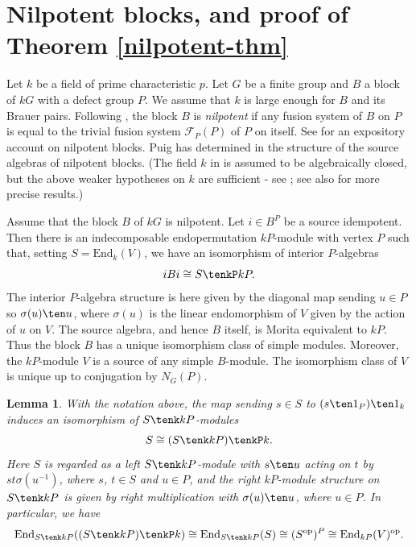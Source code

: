 \documentclass{amsart}
\theoremstyle{plain}\newtheorem{Theorem}{Theorem}[section]
\theoremstyle{plain}\newtheorem{Conjecture}[Theorem]{Conjecture}
\theoremstyle{plain}\newtheorem{Corollary}[Theorem]{Corollary}
\theoremstyle{plain}\newtheorem{Lemma}[Theorem]{Lemma}
\theoremstyle{plain}\newtheorem{Proposition}[Theorem]{Proposition}
\theoremstyle{definition}\newtheorem{Definition}[Theorem]{Definition}
\theoremstyle{definition}\newtheorem{Example}[Theorem]{Example}
\theoremstyle{definition}\newtheorem{Examples}[Theorem]{Examples}
\theoremstyle{definition}\newtheorem{Exercise}[Theorem]{Exercise}
\theoremstyle{definition}\newtheorem{Notation}[Theorem]{Notation}
\theoremstyle{definition}\newtheorem{Remark}[Theorem]{Remark}
\theoremstyle{definition}\newtheorem{Remarks}[Theorem]{Remarks}
\theoremstyle{plain}\newtheorem{Statement}[Theorem]{}
\def\CF{{\mathcal{F}}}  \def\OS{{\mathcal{O}S}}
\def\End{\mathrm{End}}
\def\op{\mathrm{op}}
\begin{document}
\section{Nilpotent blocks, and proof of Theorem \ref{nilpotent-thm} }
\label{nilpotent-Section}   %

Let $k$ be  a field of prime characteristic $p$. Let $G$ be a finite group and $B$ a 
block of $kG$ with a defect group $P$.
We assume that $k$ is large enough for $B$ and its Brauer pairs.
Following \cite{BrPunil}, the block $B$ is {\em nilpotent} if any fusion system
of $B$ on $P$ is equal to the trivial fusion system $\CF_P(P)$ of $P$ on itself.
See \cite[Section 8.11]{LiBookII} for an expository account on nilpotent blocks.
Puig has determined in \cite{Punil} the structure of the source algebras of
nilpotent blocks. (The field $k$ in \cite{Punil} is assumed to be algebraically closed,
but the above weaker hypotheses on $k$ are sufficient - see 
\cite[Remark 1.14]{Punil}; see also \cite[Theorem 1.22]{FanPuig} for more precise 
results.)  

Assume that the block $B$ of $kG$ is nilpotent. Let $i\in B^P$ be a source idempotent.
Then there is an indecomposable endopermutation $kP$-module with vertex $P$
such that, setting $S=\End_k(V)$, we have an isomorphism of interior $P$-algebras
$$iBi \cong S \tenkP kP.$$
The interior $P$-algebra structure is here given by the diagonal map sending $u\in P$
so $\sigma(u)\ten u$, where $\sigma(u)$ is the linear endomorphism of $V$ given
by the action of $u$ on $V$. The source algebra, and hence $B$ itself, is Morita
equivalent to $kP$. Thus the  block $B$ has a unique isomorphism class of
simple modules. Moreover, the $kP$-module $V$ is a source of any simple 
$B$-module.  The isomorphism class of $V$ is unique up to conjugation by $N_G(P)$.

\begin{Lemma} \label{nilpotent-Lemma}
With the notation above, the map sending $s\in S$ to $(s\ten 1_P)\ten 1_k$
induces an isomorphism of $S\tenk kP$-modules
$$S \cong (S\tenk kP) \tenkP k.$$
Here $S$ is regarded as a left $S\tenk kP$-module with $s\ten u$ acting on $t$
by $st\sigma(u^{-1})$, where $s$, $t\in S$ and $u\in P$, and the right
$kP$-module structure on $S\tenk kP$ is given by right multiplication with
$\sigma(u)\ten u$, where $u\in P$. In particular, we have
$$\End_{S\tenk kP}((S\tenk kP) \tenkP k) \cong \End_{S\tenk kP}(S)\cong 
(S^\op)^P \cong \End_{kP}(V)^\op.$$
\end{Lemma}
\end{document}
